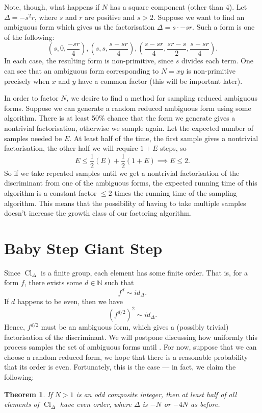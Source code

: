 \documentclass[honours,12pt]{unswthesis}
\newcommand{\N}{\mathbb{N}} %
\DeclareMathOperator{\Cl}{Cl}
\newtheorem{theorem}{Theorem}[section]
\numberwithin{equation}{section}
\begin{document}
Note, though, what happens if $N$ has a square component (other than 4).
Let $\Delta = -s^2 r$, where $s$ and $r$ are positive and $s > 2$.
Suppose we want to find an ambiguous form which gives us the factorisation $\Delta = s \cdot -sr$.
Such a form is one of the following:
$$\left( s, 0, \frac{-sr}{4} \right), \left(s, s, \frac{s - sr}{4}\right), \left(\frac{s - sr}{4}, \frac{sr - s}{2}, \frac{s - sr}{4}\right).$$
In each case, the resulting form is non-primitive, since $s$ divides each term.
One can see that an ambiguous form corresponding to $N = xy$ is non-primitive precisely when $x$ and $y$ have a common factor (this will be important later).

In order to factor $N$, we desire to find a method for sampling reduced ambiguous forms.
Suppose we can generate a random reduced ambiguous form using some algorithm. 
There is at least 50\% chance that the form we generate gives a nontrivial factorisation, otherwise we sample again.
Let the expected number of samples needed be $E$.
At least half of the time, the first sample gives a nontrivial factorisation, the other half we will require $1 + E$ steps, so
$$E \leq \frac{1}{2}(E) + \frac{1}{2}(1 + E) \implies E \leq 2.$$
So if we take repeated samples until we get a nontrivial factorisation of the discriminant from one of the ambiguous forms, the expected running time of this algorithm is a constant factor $\leq 2$ times the running time of the sampling algorithm.
This means that the possibility of having to take multiple samples doesn't increase the growth class of our factoring algorithm.


\pagebreak
\section{Baby Step Giant Step} \label{s-bsgs}
Since $\Cl_\Delta$ is a finite group, each element has some finite order.
That is, for a form $f$, there exists some $d \in \N$ such that
$$f^d \sim id_\Delta.$$
If $d$ happens to be even, then we have
$$(f^{d/2})^2 \sim id_\Delta.$$
Hence, $f^{d/2}$ must be an ambiguous form, which gives a (possibly trivial) factorisation of the discriminant.
We will postpone discussing how uniformly this process samples the set of ambiguous forms until .
For now, suppose that we can choose a random reduced form, we hope that there is a reasonable probability that its order is even.
Fortunately, this is the case ---
in fact, we claim the following:

\vspace{2mm}
\begin{theorem}
    If $N > 1$ is an odd composite integer, then at least half of all elements of $\Cl_\Delta$ have even order, where $\Delta$ is $-N$ or $-4N$ as before.
\end{theorem}
\end{document}
